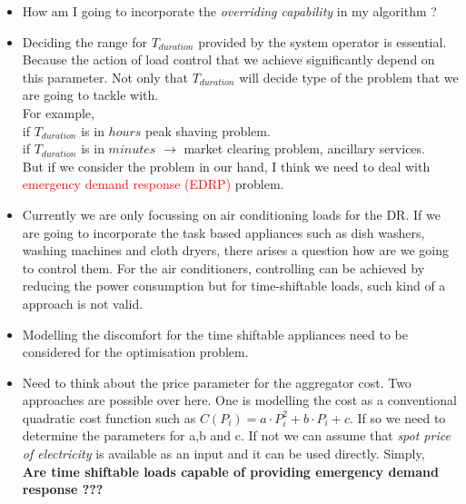 \documentclass[12pt,a4paper]{article}
\begin{document}
\begin{itemize}

\item How am I going to incorporate the \emph{overriding capability }in my algorithm ?

\item Deciding the range for $T_{duration}$ provided by the system operator is essential. Because the action of load control that we achieve significantly depend on this parameter. Not only that $T_{duration}$ will decide type of the problem that we are going to tackle with.\\

For example, \\

if $T_{duration}$ is in $hours$  peak shaving problem.\\
if $T_{duration}$ is in $minutes$ $\longrightarrow$ market clearing problem, ancillary services.\\

But if we consider the problem in our hand, I think we need to deal with \textcolor{red}{emergency demand response (EDRP)} \cite{7063260,SIANO2014461,6861959} problem.

    \item Currently we are only focussing on air conditioning loads for the DR. If we are going to incorporate the task based appliances such as dish washers, washing machines and cloth dryers, there arises a question how are we going to control them. For the air conditioners, controlling can be achieved by reducing the power consumption but for time-shiftable loads, such kind of a approach is not valid. 
    
    \item Modelling the discomfort for the time shiftable appliances need to be considered for the optimisation problem.
    
    \item Need to think about the price parameter for the aggregator cost. Two approaches are possible over here. One is modelling the cost as a conventional quadratic cost function such as $C(P_{i})= a\cdot P_{i}^2+b\cdot P_{i}+c$. If so we need to determine the parameters for a,b and c. If not we can assume that \emph{spot price of electricity} is available as an input and it can be used directly. Simply,\\
    
\textbf{Are time shiftable loads capable of providing emergency demand response ???}\\
    

\end{itemize}
\end{document}
